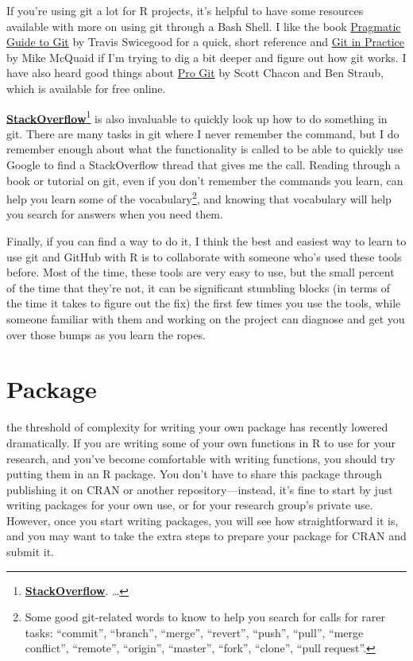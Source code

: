 \documentclass[]{tufte-book}
\begin{document}
If you're using git a lot for R projects, it's helpful to have some resources available with
more on using git through a Bash Shell. I like the book \href{https://www.amazon.com/Pragmatic-Guide-Git-Programmers/dp/1934356727/ref=sr_1_28?keywords=git\&qid=1554173700\&s=gateway\&sr=8-28}{Pragmatic Guide to Git} by Travis Swicegood for a quick, short reference and
\href{https://www.amazon.com/Git-Practice-Techniques-Mike-McQuaid/dp/1617291978/ref=sr_1_60?keywords=git\&qid=1554174811\&s=gateway\&sr=8-60}{Git in Practice} by Mike McQuaid if I'm trying to dig a bit deeper
and figure out how git works.
I have also heard good things about \href{https://git-scm.com/book/en/v2}{Pro Git} by Scott Chacon and
Ben Straub, which is available for free online.

\href{https://stackoverflow.com/}{\textbf{StackOverflow}}\footnote{\href{https://stackoverflow.com/}{\textbf{StackOverflow}}.
  \ldots{}}
is also invaluable to quickly look up how to do something in git. There are
many tasks in git where I never remember the command, but I do remember enough about what
the functionality is called to be able to quickly use Google to find a StackOverflow thread
that gives me the call. Reading through a book or tutorial on git, even if you don't
remember the commands you learn, can help you learn some of the vocabulary\footnote{Some good git-related
  words to know to help you search for calls for rarer tasks: ``commit'', ``branch'', ``merge'', ``revert'',
  ``push'', ``pull'', ``merge conflict'', ``remote'', ``origin'', ``master'', ``fork'', ``clone'', ``pull request''.},
and knowing that vocabulary will help you search for answers when you need them.

Finally, if you can find a way to do it, I think the best and easiest way to learn to use git
and GitHub with R is to collaborate with someone who's used these tools before. Most of the
time, these tools are very easy to use, but the small percent of the time that they're not,
it can be significant stumbling blocks (in terms of the time it takes to figure out the fix)
the first few times you use the tools, while someone familiar with them and working on the
project can diagnose and get you over those bumps as you learn the ropes.

\hypertarget{package}{%
\chapter{Package}\label{package}}

 the threshold of complexity
for writing your own package has recently lowered dramatically. If you are writing
some of your own functions in R to use for your research, and you've become comfortable
with writing functions, you should try putting them in an R package. You don't have
to share this package through publishing it on CRAN or another repository---instead, it's
fine to start by just writing packages for your own use, or for your research group's
private use. However, once you start writing packages, you will see how straightforward
it is, and you may want to take the extra steps to prepare your package for CRAN and
submit it.
\end{document}
